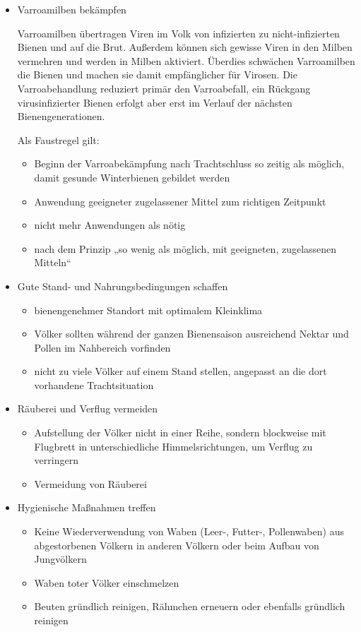 \begin{itemize}
    \item Varroamilben bekämpfen
    
    Varroamilben übertragen Viren im Volk von infizierten zu nicht-infizierten Bienen und auf die Brut. Außerdem können sich gewisse Viren in den Milben vermehren und werden in Milben aktiviert. Überdies schwächen Varroamilben die Bienen und machen sie damit empfänglicher für Virosen. Die Varroabehandlung reduziert primär den Varroabefall, ein Rückgang virusinfizierter Bienen erfolgt aber erst im Verlauf der nächsten Bienengenerationen.
    
    Als Faustregel gilt:
    \begin{itemize}
        \item Beginn der Varroabekämpfung nach Trachtschluss so zeitig als möglich, damit gesunde Winterbienen gebildet werden
        \item Anwendung geeigneter zugelassener Mittel zum richtigen Zeitpunkt
        \item nicht mehr Anwendungen als nötig
        \item nach dem Prinzip „so wenig als möglich, mit geeigneten, zugelassenen Mitteln“
    \end{itemize}
    \item Gute Stand- und Nahrungsbedingungen schaffen
    \begin{itemize}
        \item bienengenehmer Standort mit optimalem Kleinklima
        \item Völker sollten während der ganzen Bienensaison ausreichend Nektar und Pollen im Nahbereich vorfinden
        \item nicht zu viele Völker auf einem Stand stellen, angepasst an die dort vorhandene Trachtsituation
    \end{itemize}
    \item Räuberei und Verflug vermeiden
    \begin{itemize}
        \item Aufstellung der Völker nicht in einer Reihe, sondern blockweise mit Flugbrett in unterschiedliche Himmelsrichtungen, um Verflug zu verringern
        \item Vermeidung von Räuberei
    \end{itemize}
    \item Hygienische Maßnahmen treffen
    \begin{itemize}
        \item Keine Wiederverwendung von Waben (Leer-, Futter-, Pollenwaben) aus abgestorbenen Völkern in anderen Völkern oder beim Aufbau von Jungvölkern
        \item Waben toter Völker einschmelzen
        \item Beuten gründlich reinigen, Rähmchen erneuern oder ebenfalls gründlich reinigen
    \end{itemize}
\end{itemize}

